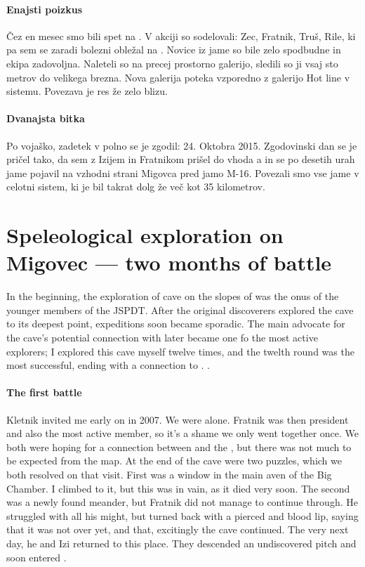 \paragraph{Enajsti poizkus} Čez en mesec smo bili spet na . V akciji so sodelovali: Zec, Fratnik, Truš, Rile, ki pa sem se zaradi bolezni obležal na . Novice iz jame so bile zelo spodbudne in ekipa zadovoljna. Naleteli so na precej prostorno galerijo, sledili so ji vsaj sto metrov do velikega brezna. Nova galerija poteka vzporedno z galerijo Hot line v sistemu. Povezava je res že zelo blizu. 

\paragraph{Dvanajsta bitka} 
Po vojaško, zadetek v polno se je zgodil: 24. Oktobra 2015. Zgodovinski dan se je pričel tako, da sem z Izijem in Fratnikom prišel do vhoda a in se po desetih urah jame pojavil na vzhodni strani Migovca pred jamo M-16. Povezali smo vse jame v celotni sistem, ki je bil takrat dolg že več kot 35 kilometrov. 

\section{Speleological exploration on Migovec --- two months of battle}

In the beginning, the exploration of  cave on the slopes of  was the onus of the younger members of the JSPDT. After the original discoverers explored the cave to its deepest point, expeditions soon became sporadic. The main advocate for the cave's potential connection with  later became one fo the most active explorers; I explored this cave myself twelve times, and the twelth round was the most successful, ending  with a connection to . .

\paragraph{The first battle}
Kletnik invited me early on in 2007. We were alone. Fratnik was then president and also the most active member, so it's a shame we only went together once. We both were hoping for a connection between  and the , but there was not much to be expected from the map. At the end of the cave were two puzzles, which we both resolved on that visit. First was a window in the main aven of the Big Chamber. I climbed to it, but this was in vain, as it died very soon. The second was a newly found meander, but Fratnik did not manage to continue through. He struggled with all his might, but turned back with a pierced and blood lip, saying that it was not over yet, and that, excitingly the cave continued. The very next day, he and Izi returned to this place. They descended an undiscovered pitch and soon entered . 

